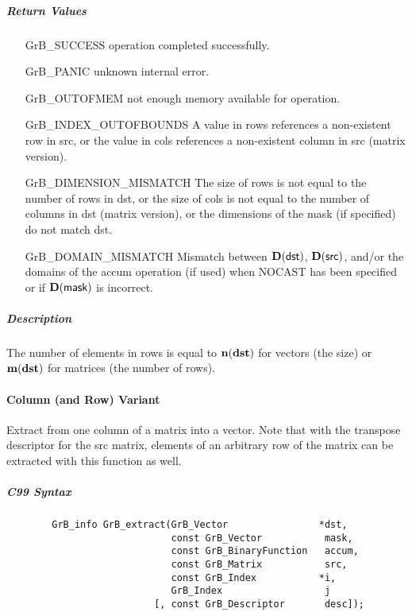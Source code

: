 \subparagraph{Return Values}


\begin{itemize}[leftmargin=2.1in]
\item[{\sf GrB\_SUCCESS}]     operation completed successfully.
\item[{\sf GrB\_PANIC}]        unknown internal error.
\item[{\sf GrB\_OUTOFMEM}]    not enough memory available for operation.
\item[{\sf GrB\_INDEX\_OUTOFBOUNDS}]
        A value in rows references a non-existent row in src, or
        the value in cols references a non-existent column in src (matrix version).
\item[{\sf GrB\_DIMENSION\_MISMATCH}] 
        The size of rows is not equal to the number of rows in dst, or
        the size of cols is not equal to the number of columns in dst (matrix version), or
        the dimensions of the mask (if specified) do not match dst.
\item[{\sf GrB\_DOMAIN\_MISMATCH}]    Mismatch between $\bold{D}(\sf dst)$, 
                                      $\bold{D}({\sf src})$, and/or the domains of the 
                                      {\sf accum} operation (if used) when {\sf NOCAST} has
                                      been specified or if $\bold{D}(\sf mask)$ is incorrect.
\end{itemize}


\subparagraph{Description}

The number of elements in {\sf rows} is equal to $\bold{n}({\bf dst})$ for 
vectors (the size) or $\bold{m}({\bf dst})$ for matrices (the number of rows).


\paragraph{Column (and Row) Variant}

Extract from one column of a matrix into a vector.  Note that with the transpose
descriptor for the {\sf src} matrix, elements of an arbitrary row of the matrix
can be extracted with this function as well.

\subparagraph{C99 Syntax}

\begin{verbatim}
        GrB_info GrB_extract(GrB_Vector                *dst,
                             const GrB_Vector           mask,
                             const GrB_BinaryFunction   accum,
                             const GrB_Matrix           src,
                             const GrB_Index           *i,
                             GrB_Index                  j
                          [, const GrB_Descriptor       desc]); 
\end{verbatim}

